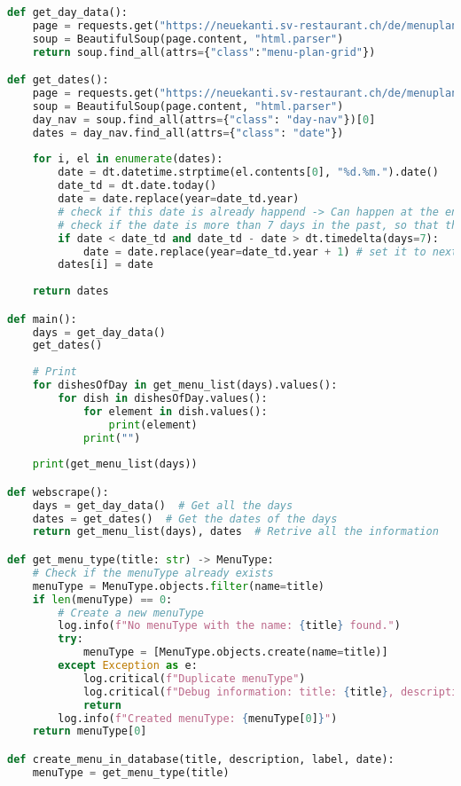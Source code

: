 \begin{lstlisting}[language=Python]
def get_day_data():
    page = requests.get("https://neuekanti.sv-restaurant.ch/de/menuplan/")
    soup = BeautifulSoup(page.content, "html.parser")
    return soup.find_all(attrs={"class":"menu-plan-grid"})

def get_dates():
    page = requests.get("https://neuekanti.sv-restaurant.ch/de/menuplan/")
    soup = BeautifulSoup(page.content, "html.parser")
    day_nav = soup.find_all(attrs={"class": "day-nav"})[0]
    dates = day_nav.find_all(attrs={"class": "date"})
    
    for i, el in enumerate(dates):
        date = dt.datetime.strptime(el.contents[0], "%d.%m.").date()
        date_td = dt.date.today()
        date = date.replace(year=date_td.year)
        # check if this date is already happend -> Can happen at the end of the year
        # check if the date is more than 7 days in the past, so that this won't be triggered when the mensa page is not updated correctly.
        if date < date_td and date_td - date > dt.timedelta(days=7):
            date = date.replace(year=date_td.year + 1) # set it to next year
        dates[i] = date
    
    return dates

def main():
    days = get_day_data()
    get_dates()
    
    # Print
    for dishesOfDay in get_menu_list(days).values():
        for dish in dishesOfDay.values():
            for element in dish.values():
                print(element)
            print("")
    
    print(get_menu_list(days))

def webscrape():
    days = get_day_data()  # Get all the days
    dates = get_dates()  # Get the dates of the days
    return get_menu_list(days), dates  # Retrive all the information

def get_menu_type(title: str) -> MenuType:
    # Check if the menuType already exists
    menuType = MenuType.objects.filter(name=title)
    if len(menuType) == 0:
        # Create a new menuType
        log.info(f"No menuType with the name: {title} found.")
        try:
            menuType = [MenuType.objects.create(name=title)]
        except Exception as e:
            log.critical(f"Duplicate menuType")
            log.critical(f"Debug information: title: {title}, description: {description}, label: {label}, date: {date}, menuType: {menuType}")
            return
        log.info(f"Created menuType: {menuType[0]}")
    return menuType[0]

def create_menu_in_database(title, description, label, date):
    menuType = get_menu_type(title)
    

\end{lstlisting}
